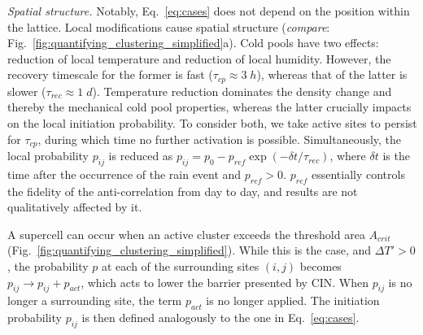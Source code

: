 \documentclass{article}
\begin{document}
\begin{methods}
\noindent
{\it Spatial structure.} 
Notably, Eq.~\ref{eq:cases} does not depend on the position within the lattice. 
Local modifications cause spatial structure ({\it compare}: Fig.~\ref{fig:quantifying_clustering_simplified}a).
Cold pools have two effects: reduction of local temperature and reduction of local humidity. 
However, the recovery timescale for the former is fast ($\tau_{cp}\approx 3\;h$), whereas that of the latter is slower ($\tau_{rec}\approx 1\;d$).
Temperature reduction dominates the density change and thereby the mechanical cold pool properties, whereas the latter crucially impacts on the local initiation probability.
To consider both, we take active sites to persist for $\tau_{cp}$, during which time no further activation is possible.
Simultaneously, the local probability $p_{ij}$ is reduced as $p_{ij}=p_0-p_{ref}\exp(-\delta t/\tau_{rec})$, where $\delta t$ is the time after the occurrence of the rain event and $p_{ref}>0$. 
$p_{ref}$ essentially controls the fidelity of the anti-correlation from day to day, and results are not qualitatively affected by it.

A supercell can occur when an active cluster exceeds the threshold area $A_{crit}$ (Fig.~\ref{fig:quantifying_clustering_simplified}). 
While this is the case, and $\Delta T'>0$, the probability $p$ at each of the surrounding sites $(i,j)$ becomes $p_{ij}\rightarrow p_{ij}+p_{act}$, which acts to lower the barrier presented by CIN.
When $p_{ij}$ is no longer a surrounding site, the term $p_{act}$ is no longer applied.
The initiation probability $p_{ij}$ is then defined analogously to the one in Eq.~\ref{eq:cases}.


\end{methods}
\end{document}
